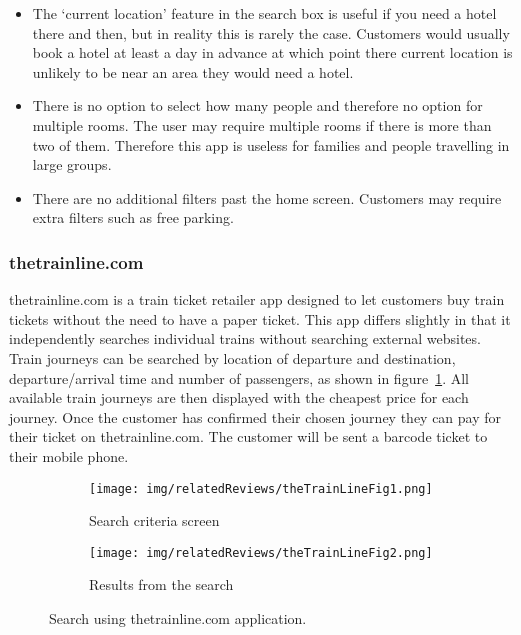 \begin{itemize}
	\item The `current location' feature in the search box is useful if you
		need a hotel there and then, but in reality this is rarely the case.
		Customers would usually book a hotel at least a day in advance at which
		point there current location is unlikely to be near an area they would
		need a hotel.
	\item There is no option to select how many people and therefore no option
		for multiple rooms. The user may require multiple rooms if there is
		more than two of them. Therefore this app is useless for families and
		people travelling in large groups.
	\item There are no additional filters past the home screen. Customers may
		require extra filters such as free parking.
\end{itemize}

\newpage

\subsubsection{thetrainline.com}
\label{ssub:thetrainline}

thetrainline.com is a train ticket retailer app designed to let customers buy
train tickets without the need to have a paper ticket. This app differs
slightly in that it independently searches individual trains without searching
external websites. Train journeys can be searched by location of departure and
destination, departure/arrival  time and number of passengers, as shown in
figure~\ref{fig:theTrainLineFig1}. All available train journeys are then
displayed with the cheapest price for each journey.  Once the customer has
confirmed their chosen journey they can pay for their ticket on
thetrainline.com. The customer will be sent a barcode ticket to their mobile
phone.
\begin{figure}[ht]
	\centering
	\begin{subfigure}[b]{0.2\textwidth}
		\texttt{[image: img/relatedReviews/theTrainLineFig1.png]}
		\caption{Search criteria screen}\label{fig:theTrainLineFig1}
	\end{subfigure}%
	\qquad
	\begin{subfigure}[b]{0.2\textwidth}
		\texttt{[image: img/relatedReviews/theTrainLineFig2.png]}
		\caption{Results from the search}\label{fig:theTrainLineFig2}
	\end{subfigure}
	\caption{Search using thetrainline.com application.
	}\label{fig:thetrainline1}
\end{figure}


